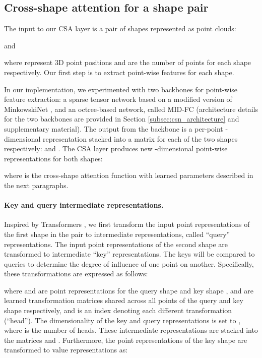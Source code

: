 \documentclass{egpubl}
\begin{document}
\vspace*{-3mm}
\subsection{Cross-shape attention for a shape pair}
\label{subsec:cross_shape_attention}

The input to our CSA layer is a pair of shapes represented as point clouds:

and 

where  represent 3D point positions and  
are the number of points for each shape respectively. Our first step is to extract point-wise features for each shape.

In our implementation, we experimented with two backbones for point-wise feature extraction: a sparse tensor network based on a modified version of MinkowskiNet 
\cite{Choy:2019}, and an octree-based network, called MID-FC \cite{Wang:2021} (architecture details for the two backbones are provided in Section
\ref{subsec:csn_architecture} and supplementary material). The output from the backbone is a per-point -dimensional representation stacked into a matrix for each of the two shapes respectively:  and . The CSA layer produces new -dimensional point-wise representations for both shapes:

\noindent where  is the cross-shape attention function with learned parameters  described in the next paragraphs.

\vspace{-1.4mm}    
\paragraph*{Key and query intermediate representations.}
Inspired by  Transformers  \cite{Vaswani:2017}, we first transform the input point representations of the first shape in the pair
to intermediate representations, called ``query'' representations. The input point representations of the second shape are  transformed to 
intermediate ``key'' representations. The keys will be compared to queries to determine the degree of influence of one point on another. 
Specifically,  these transformations are expressed as follows:

\noindent where  and  are point representations for the query shape  and key shape , 
and  are   learned transformation matrices shared across all points of the query and key shape respectively, and  is an index denoting each different transformation (``head'').  The dimensionality of the key and query representations  is set to , where  is the number of heads. These intermediate representations are stacked into the matrices  and . Furthermore, the point representations of the key shape  are
transformed to value representations as:
\end{document}

